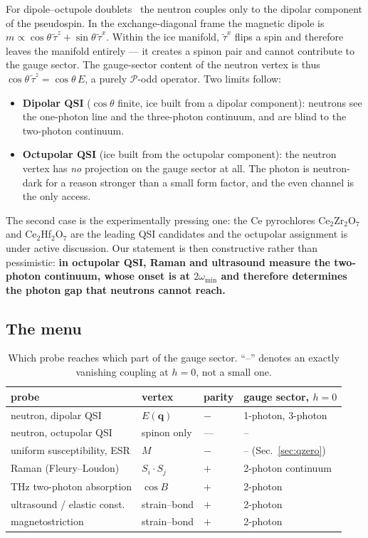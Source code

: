 \documentclass[aps,prl,preprint,amsmath,amssymb,superscriptaddress,
longbibliography,floatfix]{revtex4-2}
\DeclareRobustCommand{\bq}{\bm q}
\newcommand{\PP}{\mathcal{P}}
\begin{document}
For dipole--octupole doublets~\cite{HuangChenHermele2014} the neutron couples
only to the dipolar component of the pseudospin.  In the exchange-diagonal
frame the magnetic dipole is $m\propto\cos\theta\,\tilde\tau^z+
\sin\theta\,\tilde\tau^{x}$.  Within the ice manifold, $\tilde\tau^{x}$ flips a
spin and therefore leaves the manifold entirely --- it creates a spinon pair
and cannot contribute to the gauge sector.  The gauge-sector content of the
neutron vertex is thus $\cos\theta\,\tilde\tau^z=\cos\theta\,E$, a purely
$\PP$-odd operator.  Two limits follow:
\begin{itemize}
\item \textbf{Dipolar QSI} ($\cos\theta$ finite, ice built from a dipolar
component): neutrons see the one-photon line and the three-photon continuum,
and are blind to the two-photon continuum.
\item \textbf{Octupolar QSI} (ice built from the octupolar component): the
neutron vertex has \emph{no} projection on the gauge sector at all.  The photon
is neutron-dark for a reason stronger than a small form factor, and the even
channel is the only access.
\end{itemize}
The second case is the experimentally pressing one: the Ce pyrochlores
Ce$_2$Zr$_2$O$_7$ and Ce$_2$Hf$_2$O$_7$ are the leading QSI candidates
\cite{Gao2019,Gaudet2019,Bhardwaj2022,Smith2025} and the octupolar assignment
is under active discussion.  Our statement is then constructive rather than
pessimistic: \textbf{in octupolar QSI, Raman and ultrasound measure the
two-photon continuum, whose onset is at $2\omega_{\min}$ and therefore
determines the photon gap that neutrons cannot reach.}

\subsection{The menu}

\begin{table}[t]
\caption{Which probe reaches which part of the gauge sector.  ``--'' denotes an
exactly vanishing coupling at $h=0$, not a small one.}
\label{tab:menu}
\begin{ruledtabular}
\begin{tabular}{llll}
probe & vertex & parity & gauge sector, $h=0$\\ \hline
neutron, dipolar QSI      & $E(\bq)$        & $-$ & 1-photon, 3-photon\\
neutron, octupolar QSI    & spinon only     & --- & --\\
uniform susceptibility, ESR & $M$           & $-$ & -- (Sec.~\ref{sec:qzero})\\
Raman (Fleury--Loudon)    & $S_i\!\cdot\!S_j$ & $+$ & 2-photon continuum\\
THz two-photon absorption & $\cos B$        & $+$ & 2-photon\\
ultrasound / elastic const.& strain--bond   & $+$ & 2-photon\\
magnetostriction          & strain--bond    & $+$ & 2-photon\\
\end{tabular}
\end{ruledtabular}
\end{table}
\end{document}
